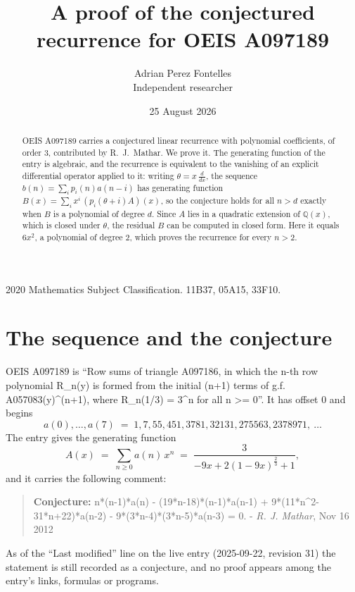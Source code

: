 \documentclass[11pt,a4paper]{article}
\title{A proof of the conjectured recurrence for OEIS A097189}
\author{Adrian Perez Fontelles\\ \small Independent researcher}
\date{25 August 2026}
\theoremstyle{plain}
\theoremstyle{definition}
\begin{document}
\maketitle

\begin{abstract}
OEIS A097189 carries a conjectured linear recurrence with polynomial coefficients, of
order 3, contributed by R.~J.~Mathar. We prove it. The generating function of the
entry is algebraic, and the recurrence is equivalent to the vanishing of an explicit
differential operator applied to it: writing $\theta=x\,\frac{d}{dx}$, the sequence
$b(n)=\sum_{i}p_{i}(n)a(n-i)$ has generating function
$B(x)=\sum_{i}x^{i}\,(p_{i}(\theta+i)A)(x)$, so the conjecture holds for all $n>d$ exactly
when $B$ is a polynomial of degree $d$. Since $A$ lies in a quadratic extension of
$\mathbb{Q}(x)$, which is closed under $\theta$, the residual $B$ can be computed in
closed form. Here it equals $6 x^{2}$, a polynomial of degree $2$, which proves
the recurrence for every $n>2$.
\end{abstract}

\noindent\small 2020 Mathematics Subject Classification. 11B37, 05A15, 33F10.\normalsize

\section{The sequence and the conjecture}

OEIS A097189 is ``Row sums of triangle A097186, in which the n-th row polynomial R\_n(y) is formed from the initial (n+1) terms of g.f. A057083(y)\^{}(n+1), where R\_n(1/3) = 3\^{}n for all n >= 0''. It has offset $0$ and begins
\[
a(0),\dots,a(7)\;=\;1, 7, 55, 451, 3781, 32131, 275563, 2378971,\ \dots
\]
The entry gives the generating function
\begin{equation}\label{eq:gf}
A(x)\;=\;\sum_{n\ge 0} a(n)\,x^{n}\;=\;\frac{3}{- 9 x + 2 \left(1 - 9 x\right)^{\frac{2}{3}} + 1} ,
\end{equation}
and it carries the following comment:
\begin{quote}\small
\textbf{Conjecture:} n*(n-1)*a(n) - (19*n-18)*(n-1)*a(n-1) + 9*(11*n\^{}2-31*n+22)*a(n-2) - 9*(3*n-4)*(3*n-5)*a(n-3) = 0. - \emph{R. J. Mathar}, Nov 16 2012
\end{quote}
As of the ``Last modified'' line on the live entry (2025-09-22, revision 31) the
statement is still recorded as a conjecture, and no proof appears among the entry's links,
formulas or programs.
\end{document}
